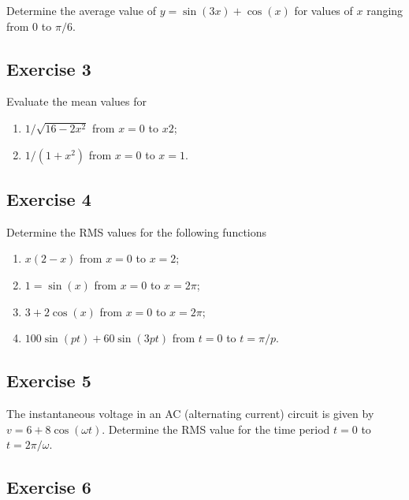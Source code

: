 \documentclass[
  11pt,
  oneside]{book}
\providecommand{\tightlist}{%
  \setlength{\itemsep}{0pt}\setlength{\parskip}{0pt}}
\newcommand{\slide}{}
\theoremstyle{definition}
\theoremstyle{definition}
\theoremstyle{definition}
\theoremstyle{definition}
\theoremstyle{remark}
\begin{document}
Determine the average value of \(y = \sin(3x) + \cos(x)\) for values of \(x\) ranging from \(0\) to \(\pi/6\).

\slide

\subsection*{Exercise 3}\label{exercise-3-7}

Evaluate the mean values for

\begin{enumerate}
\def\labelenumi{\roman{enumi}.}
\tightlist
\item
  \(1/\sqrt{16-2x^2}\) from \(x=0\) to \(x2\);
\item
  \(1/(1+x^2)\) from \(x=0\) to \(x=1\).
\end{enumerate}

\slide

\subsection*{Exercise 4}\label{exercise-4-5}

Determine the RMS values for the following functions

\begin{enumerate}
\def\labelenumi{\roman{enumi}.}
\tightlist
\item
  \(x(2-x)\) from \(x=0\) to \(x=2\);
\item
  \(1=\sin(x)\) from \(x=0\) to \(x=2\pi\);
\item
  \(3+2\cos(x)\) from \(x=0\) to \(x=2\pi\);
\item
  \(100\sin(pt)+60\sin(3pt)\) from \(t=0\) to \(t=\pi/p\).
\end{enumerate}

\slide

\subsection*{Exercise 5}\label{exercise-5-4}

The instantaneous voltage in an AC (alternating current) circuit is given by \(v = 6 + 8\cos(\omega t)\).
Determine the RMS value for the time period \(t = 0\) to \(t = 2\pi/\omega\).

\slide

\subsection*{Exercise 6}\label{exercise-6-4}
\end{document}
